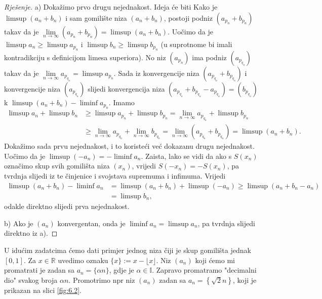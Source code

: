 \begin{proof}[Rješenje]
a) Dokažimo prvo drugu nejednakost. Ideja će biti Kako je $\limsup{(a_n+b_n)}$ i sam gomilište niza $(a_n+b_n)$, postoji podniz $(a_{p_n}+b_{p_n})$ takav da je $\lim\limits_{n\to \infty}{\left(a_{p_n}+b_{p_n}\right)}=\limsup{(a_n+b_n)}$. Uočimo da je $\limsup{a_n}\geq \limsup{a_{p_n}}$ i $\limsup{b_n}\geq \limsup{b_{p_n}}$ (u suprotnome bi imali kontradikciju s definicijom limesa superiora). No niz $\left(a_{p_n}\right)$ ima podniz $\left(a_{p_{q_n}}\right)$ takav da je $\lim\limits_{n\to \infty}{a_{p_{q_n}}}=\limsup{a_{p_n}}$. Sada iz konvergencije niza $\left(a_{p_{q_n}}+b_{p_{q_n}}\right)$ i konvergencije niza $\left(a_{p_{q_n}}\right)$ slijedi konvergencija niza $\left(a_{p_{q_n}}+b_{p_{q_n}}-a_{p_{q_n}}\right)=\left(b_{p_{q_n}}\right)$ k $\limsup{(a_n+b_n)}-\liminf{a_{p_n}}$. Imamo
\begin{align*}
\limsup{a_n}+\limsup{b_n}&\geq \limsup{a_{p_n}}+\limsup{b_{p_n}}=\lim\limits_{n\to \infty}{a_{p_{q_n}}}+\limsup{b_{p_n}}\\
&\geq \lim\limits_{n\to \infty}{a_{p_{q_n}}}+\lim\limits_{n\to \infty}{b_{p_{q_n}}}=\lim\limits_{n\to \infty}{\left(a_{p_{q_n}}+b_{p_{q_n}}\right)}=\limsup{(a_n+b_n)}.
\end{align*}
Dokažimo sada prvu nejednakost, i to koristeći već dokazanu drugu nejednakost. Uočimo da je $\limsup{\left(-a_n\right)}=-\liminf{a_n}$. Zaista, lako se vidi da ako s $S(x_n)$ označimo skup svih gomilišta niza $(x_n)$, vrijedi $S(-x_n)=-S(x_n)$, pa tvrdnja slijedi iz te činjenice i svojstava supremuma i infimuma. Vrijedi
\begin{align*}
\limsup{(a_n+b_n)}-\liminf{a_n}&=\limsup{(a_n+b_n)}+\limsup{\left(-a_n\right)}\geq \limsup{(a_n+b_n-a_n)}\\
&=\limsup{b_n},
\end{align*}
odakle direktno slijedi prva nejednakost.

b) Ako je $(a_n)$ konvergentan, onda je $\liminf{a_n}=\limsup{a_n}$, pa tvrdnja slijedi direktno iz a).
\end{proof}
U idućim zadatcima ćemo dati primjer jednog niza čiji je skup gomilišta jednak $[0, 1]$. Za $x\in \mathbb{R}$ uvedimo oznaku $\{x\}:=x-\lfloor x\rfloor$. Niz $(a_n)$ koji ćemo mi promatrati je zadan sa $a_n=\{\alpha n\}$, gdje je $\alpha\in \mathbb{I}$. Zapravo promatramo "decimalni dio" svakog broja $\alpha n$. Promotrimo npr niz $(a_n)$ zadan sa $a_n=\left\{\sqrt{2}n\right\}$, koji je prikazan na slici \ref{fig:6.2}.
